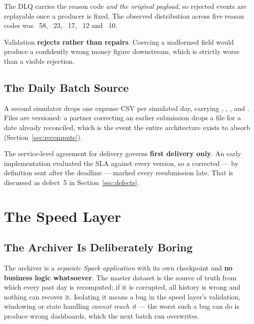 The DLQ carries the reason code \emph{and the original payload}, so
rejected events are replayable once a producer is fixed. The observed
distribution across five reason codes was ~58,
~23, ~17,
~12 and ~10.

Validation \textbf{rejects rather than repairs}. Coercing a malformed
field would produce a confidently wrong money figure downstream, which is
strictly worse than a visible rejection.

\subsection{The Daily Batch Source}

A second simulator drops one expense CSV per simulated day, carrying
, , ,
 and . Files are versioned:
a partner correcting an earlier submission drops a  file for a
date already reconciled, which is the event the entire architecture
exists to absorb (Section~\ref{sec:recompute}).

The service-level agreement for delivery governs \textbf{first delivery
only}. An early implementation evaluated the SLA against every version,
so a corrected  --- by definition sent after the deadline ---
marked every resubmission late. That is discussed as defect~5 in
Section~\ref{sec:defects}.

\section{The Speed Layer}
\label{sec:impl-speed}

\subsection{The Archiver Is Deliberately Boring}
\label{sec:impl-archiver}

The archiver is a \emph{separate Spark application} with its own
checkpoint and \textbf{no business logic whatsoever}. The master dataset
is the source of truth from which every past day is recomputed; if it is
corrupted, all history is wrong and nothing can recover it. Isolating it
means a bug in the speed layer's validation, windowing or state handling
\emph{cannot reach it} --- the worst such a bug can do is produce wrong
dashboards, which the next batch run overwrites.

